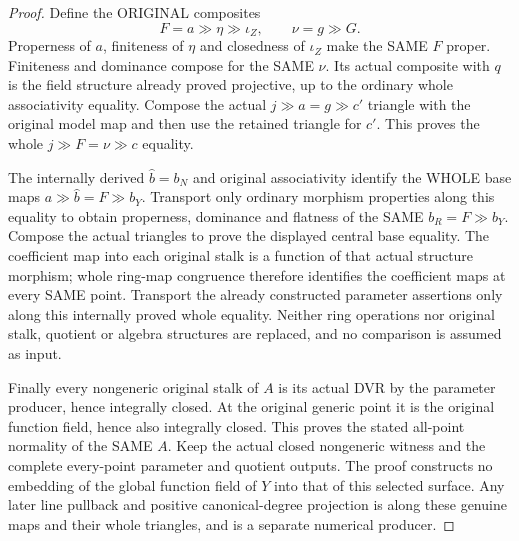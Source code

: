 \begin{proof}
Define the ORIGINAL composites
\[
 F=a\gg\eta\gg\iota_Z,\qquad \nu=g\gg G.
\]
Properness of $a$, finiteness of $\eta$ and closedness of $\iota_Z$
make the SAME $F$ proper. Finiteness and dominance compose for the
SAME $\nu$. Its actual composite with $q$ is the field structure
already proved projective, up to the ordinary whole associativity
equality. Compose the actual $j\gg a=g\gg c'$ triangle with the
original model map and then use the retained triangle for $c'$.
This proves the whole $j\gg F=\nu\gg c$ equality.

The internally derived $\widehat b=b_N$ and original associativity
identify the WHOLE base maps
$a\gg\widehat b=F\gg b_Y$. Transport only ordinary morphism
properties along this equality to obtain properness, dominance and
flatness of the SAME $b_R=F\gg b_Y$. Compose the actual triangles
to prove the displayed central base equality. The coefficient map
into each original stalk is a function of that actual structure
morphism; whole ring-map congruence therefore identifies the
coefficient maps at every SAME point. Transport the already
constructed parameter assertions only along this internally
proved whole equality. Neither ring operations nor original stalk,
quotient or algebra structures are replaced, and no comparison is
assumed as input.

Finally every nongeneric original stalk of $A$ is its actual DVR
by the parameter producer, hence integrally closed. At the original
generic point it is the original function field, hence also
integrally closed. This proves the stated all-point normality of
the SAME $A$. Keep the actual closed nongeneric witness and the
complete every-point parameter and quotient outputs. The proof
constructs no embedding of the global function field of $Y$ into
that of this selected surface. Any later line pullback and positive
canonical-degree projection is along these genuine maps and their
whole triangles, and is a separate numerical producer.
\end{proof}
